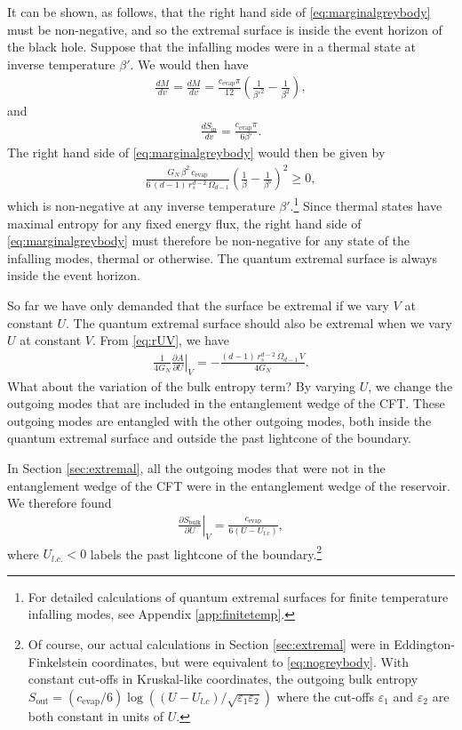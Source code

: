 \documentclass[12pt]{article}
\begin{document}
It can be shown, as follows, that the right hand side of \eqref{eq:marginalgreybody} must be non-negative, and so the extremal surface is inside the event horizon of the black hole. Suppose that the infalling modes were in a thermal state at inverse temperature $\beta'$. We would then have
\begin{align}
\frac{dM}{dv} = \frac{d M}{d v} =\frac{c_\text{evap} \pi}{12} (\frac{1}{\beta'^2} - \frac{1}{\beta^2}),
\end{align}
and \cite{calabrese2004entanglement, calabrese2009entanglement}
\begin{align}
\frac{d S_\text{in}}{d v} = \frac{c_\text{evap} \pi}{6 \beta'}.
\end{align}
The right hand side of \eqref{eq:marginalgreybody} would then be given by 
\begin{align} \label{eq:positiverhs}
\frac{G_N \,\beta^2\,c_\text{evap}}{6\,(d-1)\, r_s^{d-2} \,\Omega_{d-1}}\left(\frac{1}{\beta} - \frac{1}{\beta'}\right)^2 \geq 0,
\end{align}
which is non-negative at any inverse temperature $\beta'$.\footnote{For detailed calculations of quantum extremal surfaces for finite temperature infalling modes, see Appendix \ref{app:finitetemp}.} Since thermal states have maximal entropy for any fixed energy flux, the right hand side of \eqref{eq:marginalgreybody} must therefore be non-negative for any state of the infalling modes, thermal or otherwise. The quantum extremal surface is always inside the event horizon.

So far we have only demanded that the surface be extremal if we vary $V$ at constant $U$. The quantum extremal surface should also be extremal when we vary $U$ at constant $V$. From \eqref{eq:rUV}, we have
\begin{align} \label{eq:dA/dU}
\frac{1}{4 G_N} \left. \frac{\partial A}{\partial U} \right|_V =  - \frac{(d-1)\, r_s^{d-2} \,\Omega_{d-1}\, V}{4 G_N}.
\end{align}
What about the variation of the bulk entropy term? By varying $U$, we change the outgoing modes that are included in the entanglement wedge of the CFT. These outgoing modes are entangled with the other outgoing modes, both inside the quantum extremal surface and outside the past lightcone of the boundary. 

In Section \ref{sec:extremal}, all the outgoing modes that were not in the entanglement wedge of the CFT were in the entanglement wedge of the reservoir. We therefore found
\begin{align} \label{eq:nogreybody}
\left. \frac{\partial S_\text{bulk}}{\partial U} \right|_V = \frac{c_\text{evap}}{6(U - U_{l.c})},
\end{align}
where $U_{l.c.} < 0$ labels the past lightcone of the boundary.\footnote{Of course, our actual calculations in Section \ref{sec:extremal} were in Eddington-Finkelstein coordinates, but were equivalent to \eqref{eq:nogreybody}. With constant cut-offs in Kruskal-like coordinates, the outgoing bulk entropy $S_\text{out} = (c_\text{evap}/ 6)\log((U - U_{l.c})/ \sqrt{\varepsilon_1 \varepsilon_2})$ where the cut-offs $\varepsilon_1$ and $\varepsilon_2$ are both constant in units of $U$.} 
\end{document}
